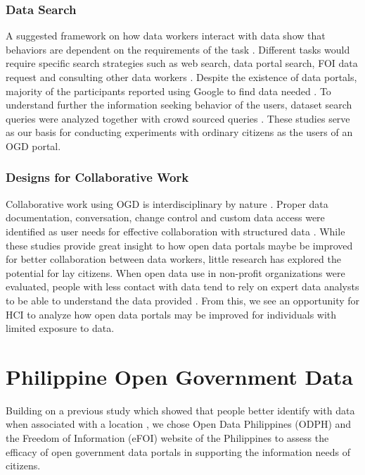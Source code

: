 \documentclass{sigchi}
\begin{document}
\subsubsection{Data Search}
A suggested framework on how data workers interact with data show that behaviors are dependent on the requirements of the task \cite{koesten2017trials}. Different tasks would require specific search strategies such as web search, data portal search, FOI data request and consulting other data workers \cite{koesten2017trials}. Despite the existence of data portals, majority of the participants reported using Google to find data needed \cite{koesten2017trials}. To understand further the information seeking behavior of the users, dataset search queries were analyzed together with crowd sourced queries \cite{kacprzak2019characterising}. These studies serve as our basis for conducting experiments with ordinary citizens as the users of an OGD portal. 

\subsubsection{Designs for Collaborative Work}
Collaborative work using OGD is interdisciplinary by nature \cite{choi2017characteristics}. Proper data documentation, conversation, change control and custom data access were identified as user needs for effective collaboration with structured data \cite{koesten2019collaborative}. While these studies provide great insight to how open data portals maybe be improved for better collaboration between data workers, little research has explored the potential for lay citizens. When open data use in non-profit organizations were evaluated, people with less contact with data tend to rely on expert data analysts to be able to understand the data provided \cite{Erete2016}. From this, we see an opportunity for HCI to analyze how open data portals may be improved for individuals with limited exposure to data.

\section{Philippine Open Government Data}
Building on a previous study which showed that people better identify with data when associated with a location \cite{Puussaar2018}, we chose Open Data Philippines (ODPH) and the Freedom of Information (eFOI) website of the Philippines to assess the efficacy of open government data portals in supporting the information needs of citizens. 
\end{document}
